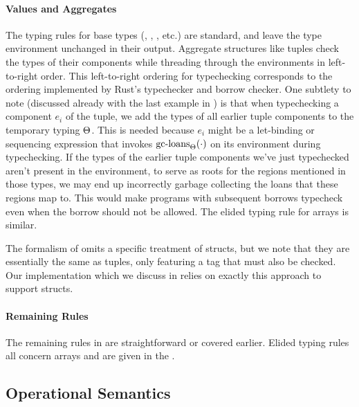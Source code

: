 \paragraph{Values and Aggregates} The typing rules for base types
(, , , etc.) are standard, and
leave the type environment unchanged in their output. Aggregate structures like
tuples check the types of their components while threading through the
environments in left-to-right order. This left-to-right ordering for
typechecking corresponds to the ordering implemented by Rust's typechecker and
borrow checker. One subtlety to note (discussed already with the last example in
) is that when typechecking a component $e_i$ of the tuple, we add
the types of all earlier tuple components to the temporary typing $\Theta$.
This is needed because $e_i$ might be a let-binding or sequencing expression
that invokes $\textrm{gc-loans}_{\Theta}(\cdot)$ on its environment during
typechecking. If the types of the earlier tuple components we've just
typechecked aren't present in the environment, to serve as roots for the
regions mentioned in those types, we may end up incorrectly garbage collecting
the loans that these regions map to. This would make programs with subsequent
borrows typecheck even when the borrow should not be allowed. The elided typing
rule for arrays is similar.

The formalism of \lang omits a specific treatment of structs, but we note that
they are essentially the same as tuples, only featuring a tag that must also be
checked. Our implementation which we discuss in 
relies on exactly this approach to support structs.

\paragraph{Remaining Rules} The remaining rules in  are
straightforward or covered earlier. Elided typing rules all concern arrays and
are given in the .

\subsection{Operational Semantics}
\label{sec:dynamics}

